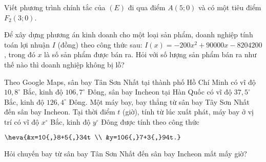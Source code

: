 \begin{bt}%
	Viết phương trình chính tắc của $(E)$ đi qua điểm $A(5;0)$ và có một tiêu điểm $F_2(3;0)$.
\end{bt}

\begin{bt}%
	Để xây dựng phương án kinh doanh cho một loại sản phẩm, doanh nghiệp tính toán lợi nhuận $I$ (đồng) theo công thức sau: $I(x)=-200x^2+90000x-8204200$, trong đó $x$ là số sản phẩm được bán ra. Hỏi với số lượng sản phẩm bán ra như thế nào thì doanh nghiệp không bị lỗ?
\end{bt}
\begin{bt}%
	Theo Google Maps, sân bay Tân Sơn Nhất tại thành phố Hồ Chí Minh có vĩ độ $10{,}8^\circ$ Bắc, kinh độ $106{,}7^\circ$ Đông, sân bay Incheon tại Hàn Quốc có vĩ độ $37{,}5^\circ$ Bắc, kinh độ $126{,}4^\circ$ Đông. Một máy bay, bay thẳng từ sân bay Tây Sơn Nhất đến sân bay Incheon. Tại thời điểm $t$ (giờ), tính từ lúc xuất phát, máy bay ở vị trí có vĩ độ $x^\circ$ Bắc, kinh độ $y^\circ$ Đông được tính theo công thức
	\begin{center}
		$\heva{&x=10{,}8+5{,}34t \\ &y=106{,}7+3{,}94t.}$
	\end{center}
	Hỏi chuyến bay từ sân bay Tân Sơn Nhất đến sân bay Incheon mất mấy giờ?
\end{bt}

